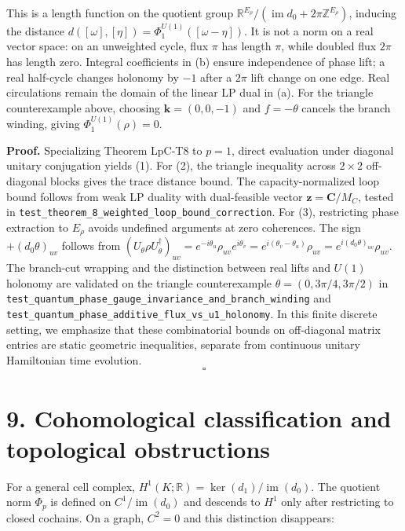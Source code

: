 \documentclass[
]{article}
\begin{document}
\begin{enumerate}
  This is a length function on the quotient group \(\mathbb{R}^{E_\rho}/(\operatorname{im}d_0+2\pi\mathbb{Z}^{E_\rho})\), inducing the distance \(d([\omega],[\eta])=\Phi_1^{U(1)}([\omega-\eta])\). It is not a norm on a real vector space: on an unweighted cycle, flux \(\pi\) has length \(\pi\), while doubled flux \(2\pi\) has length zero. Integral coefficients in (b) ensure independence of phase lift; a real half-cycle changes holonomy by \(-1\) after a \(2\pi\) lift change on one edge. Real circulations remain the domain of the linear LP dual in (a).
  For the triangle counterexample above, choosing \(\mathbf{k} = (0, 0, -1)\) and \(f = -\theta\) cancels the branch winding, giving \(\Phi_1^{U(1)}(\rho) = 0\).
\end{enumerate}

\textbf{Proof.} Specializing Theorem LpC-T8 to \(p = 1\), direct evaluation under diagonal unitary conjugation yields (1). For (2), the triangle inequality across \(2 \times 2\) off-diagonal blocks gives the trace distance bound. The capacity-normalized loop bound follows from weak LP duality with dual-feasible vector \(\mathbf{z} = \mathbf{C} / M_C\), tested in \texttt{test\_theorem\_8\_weighted\_loop\_bound\_correction}. For (3), restricting phase extraction to \(E_\rho\) avoids undefined arguments at zero coherences. The sign \(+ (d_0 \theta)_{uv}\) follows from \((U_\theta \rho U_\theta^\dagger)_{uv} = e^{-i \theta_u} \rho_{uv} e^{i \theta_v} = e^{i (\theta_v - \theta_u)} \rho_{uv} = e^{i (d_0 \theta)_{uv}} \rho_{uv}\). The branch-cut wrapping and the distinction between real lifts and \(U(1)\) holonomy are validated on the triangle counterexample \(\theta = (0, 3\pi/4, 3\pi/2)\) in \texttt{test\_quantum\_phase\_gauge\_invariance\_and\_branch\_winding} and \texttt{test\_quantum\_phase\_additive\_flux\_vs\_u1\_holonomy}.
In this finite discrete setting, we emphasize that these combinatorial bounds on off-diagonal matrix entries are static geometric inequalities, separate from continuous unitary Hamiltonian time evolution. \[\square\]

\section{9. Cohomological classification and topological obstructions}\label{cohomological-classification-and-topological-obstructions}

For a general cell complex, \(H^1(K;\mathbb{R})=\ker(d_1)/\operatorname{im}(d_0)\). The quotient norm \(\Phi_p\) is defined on \(C^1/\operatorname{im}(d_0)\) and descends to \(H^1\) only after restricting to closed cochains. On a graph, \(C^2=0\) and this distinction disappears:
\end{document}
